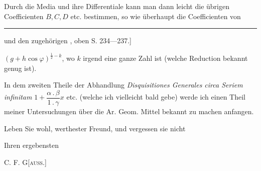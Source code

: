 \par\indent Durch die Media und ihre Differentiale kann man dann leicht die übrigen Coefficienten $B,C,D$ etc. bestimmen, so wie überhaupt die Coefficienten von
\par\vfill\noindent\rule{.25\linewidth}{.4pt}\par\smallskip
\begingroup\footnotesize
\noindent [*) Vergl. den Brief [2.] und den zugehörigen , oben S. 234—237.]\par
{}\par\endgroup
\clearpage
{}
\noindent $(g+h\cos\varphi)^{\frac12-k}$, wo $k$ irgend eine ganze Zahl ist (welche Reduction bekannt genug ist).

\par\indent In dem zweiten Theile der Abhandlung \textit{Disquisitiones Generales circa Seriem infinitam} $1+\dfrac{\alpha\, .\,\beta}{1\, .\,\gamma}x$ etc. (welche ich vielleicht bald gebe) werde ich einen Theil meiner Untersuchungen über die Ar. Geom. Mittel bekannt zu machen anfangen.

\par\indent Leben Sie wohl, werthester Freund, und vergessen sie nicht
\begin{flushright}Ihren ergebensten\par\medskip C. F. G[\textsc{auss.}]\end{flushright}
\ClosingRule
\clearpage
\endgroup
